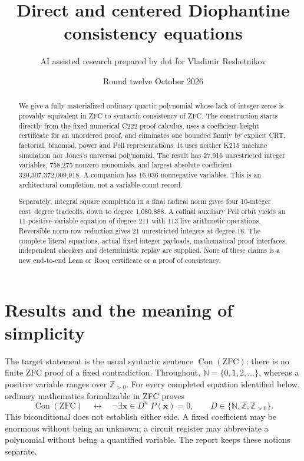 \documentclass[11pt]{article}
\title{Direct and centered Diophantine consistency equations}
\author{AI assisted research prepared by dot for Vladimir Reshetnikov}
\date{Round twelve\quad 24 October 2026}
\newcommand{\N}{\mathbb N}
\newcommand{\Z}{\mathbb Z}
\newcommand{\Con}{\operatorname{Con}}
\begin{document}
\maketitle
\begin{abstract}
We give a fully materialized ordinary quartic polynomial whose lack of
integer zeros is provably equivalent in ZFC to syntactic consistency of ZFC.
The construction starts directly from the fixed numerical C222 proof calculus,
uses a coefficient-height certificate for an unordered proof, and eliminates
one bounded family by explicit CRT, factorial, binomial, power and Pell
representations. It uses neither K215 machine simulation nor Jones's universal
polynomial. The result has 27,916 unrestricted integer variables, 758,275
nonzero monomials, and largest absolute coefficient 320,307,372,009,918.
A companion has 16,036 nonnegative variables. This is an architectural
completion, not a variable-count record.

Separately, integral square completion in a final radical norm gives four
10-integer cost--degree tradeoffs, down to degree 1,080,888. A cofinal
auxiliary Pell orbit yields an 11-positive-variable equation of degree 211
with 113 live arithmetic operations. Reversible norm-row reduction gives
21 unrestricted integers at degree 16. The complete literal equations,
actual fixed integer payloads, mathematical proof interfaces, independent
checkers and deterministic replay are supplied. None of these claims is a
new end-to-end Lean or Rocq certificate or a proof of consistency.
\end{abstract}
\tableofcontents
\newpage
\section{Results and the meaning of simplicity}
The target statement is the usual syntactic sentence
$\Con(\mathrm{ZFC})$: there is no finite ZFC proof of a fixed contradiction.
Throughout, $\N=\{0,1,2,\ldots\}$, whereas a positive variable ranges over
$\Z_{>0}$. For every completed equation identified below, ordinary mathematics
formalizable in ZFC proves
\[
 \Con(\mathrm{ZFC})\quad\longleftrightarrow\quad
 \neg\exists\boldsymbol x\in D^n\;P(\boldsymbol x)=0,
 \qquad D\in\{\N,\Z,\Z_{>0}\}.
\]
This biconditional does not establish either side. A fixed coefficient may
be enormous without being an unknown; a circuit register may abbreviate a
polynomial without being a quantified variable. The report keeps these
notions separate.
\end{document}

